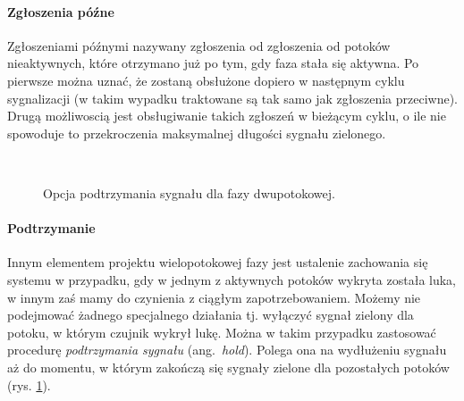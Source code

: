 \documentclass{pracamgr}
\newcommand{\ang}[1]{(ang.~\emph{#1})}
\theoremstyle{plain}
\begin{document}
\paragraph{Zgłoszenia późne} Zgłoszeniami późnymi nazywany zgłoszenia
od zgłoszenia od potoków nieaktywnych, które otrzymano już po tym, gdy
faza stała się aktywna. Po pierwsze można uznać, że zostaną obsłużone
dopiero w następnym cyklu sygnalizacji (w takim wypadku traktowane są
tak samo jak zgłoszenia przeciwne). Drugą możliwoscią jest
obsługiwanie takich zgłoszeń w bieżącym cyklu, o ile nie spowoduje to
przekroczenia maksymalnej długości sygnału zielonego.
\begin{figure}[ht]
  \centering
  \\\vspace{1cm}
  \caption{Opcja podtrzymania sygnału dla fazy dwupotokowej.}
  \label{img:signals-hold}
\end{figure}
\paragraph{Podtrzymanie} Innym elementem projektu wielopotokowej fazy
jest ustalenie zachowania się systemu w przypadku, gdy w jednym z
aktywnych potoków wykryta została luka, w innym zaś mamy do czynienia
z ciągłym zapotrzebowaniem. Możemy nie podejmować żadnego specjalnego
działania tj. wyłączyć sygnał zielony dla potoku, w którym czujnik
wykrył lukę.  Można w takim przypadku zastosować procedurę
\emph{podtrzymania sygnału} \ang{hold}. Polega ona na wydłużeniu
sygnału aż do momentu, w którym zakończą się sygnały zielone dla
pozostałych potoków (rys. \ref{img:signals-hold}).
\end{document}
